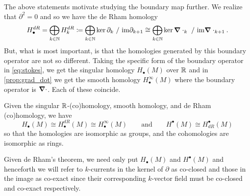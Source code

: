 \documentclass[conf]{new-aiaa}
\begin{document}
The above statements motivate studying the boundary map further. We realize that $\partial^2=0$ and so we have the de Rham homology
\begin{equation}
H_\bullet^{dR} = \bigoplus_{k\in \mathbb{N}} H_k^{dR} \coloneqq \bigoplus_{k\in \mathbb{N}} \ker \partial_k ~/~ \mathrm{im} \partial_{k+1}\cong \bigoplus_{k\in \mathbb{N}} \ker \boldsymbol{\nabla} \cdot_k ~/~ \mathrm{im} \boldsymbol{\nabla} \cdot_{k+1}. 
\end{equation}
But, what is most important, is that the homologies generated by this boundary operator are not so different. Taking the specific form of the boundary operator in \cref{eq:stokes}, we get the singular homology $H_\bullet(M)$ over $\mathbb{R}$ and in \cref{prop:grad_dot} we get the smooth homology $H^\infty_\bullet(M)$ where the boundary operator is $\boldsymbol{\nabla} \cdot$. Each of these coincide.
\begin{theorem}
    Given the singular $\mathbb{R}$-(co)homology, smooth homology, and de Rham (co)homology, we have 
\begin{equation}
    H_\bullet(M)\cong H_\bullet^{dR}(M) \cong H_\bullet^\infty(M) \qquad \textrm{and} \qquad H^\bullet(M) \cong H^\bullet_{dR}(M)
\end{equation}
so that the homologies are isomorphic as groups, and the cohomologies are isomorphic as rings.
\end{theorem}
Given de Rham's theorem, we need only put $H_\bullet(M)$ and $H^\bullet(M)$ and henceforth we will refer to $k$-currents in the kernel of $\partial$ as co-closed and those in the image as co-exact since their corresponding $k$-vector field must be co-closed and co-exact respectively.
\end{document}
